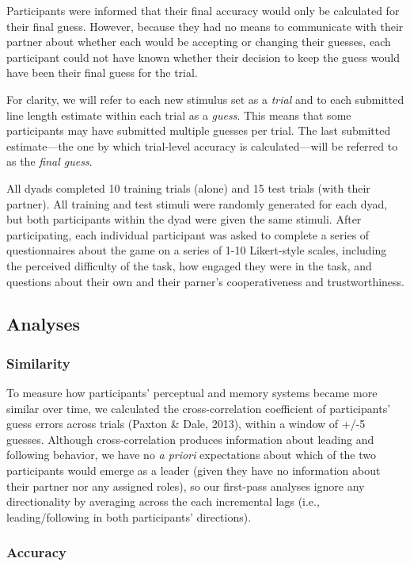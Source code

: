 \documentclass[10pt, letterpaper]{article}
\begin{document}
Participants were informed that their final accuracy would only be
calculated for their final guess. However, because they had no means to
communicate with their partner about whether each would be accepting or
changing their guesses, each participant could not have known whether
their decision to keep the guess would have been their final guess for
the trial.

For clarity, we will refer to each new stimulus set as a \emph{trial}
and to each submitted line length estimate within each trial as a
\emph{guess}. This means that some participants may have submitted
multiple guesses per trial. The last submitted estimate---the one by
which trial-level accuracy is calculated---will be referred to as the
\emph{final guess}.

All dyads completed 10 training trials (alone) and 15 test trials (with
their partner). All training and test stimuli were randomly generated
for each dyad, but both participants within the dyad were given the same
stimuli. After participating, each individual participant was asked to
complete a series of questionnaires about the game on a series of 1-10
Likert-style scales, including the perceived difficulty of the task, how
engaged they were in the task, and questions about their own and their
parner's cooperativeness and trustworthiness.

\subsection{Analyses}\label{analyses}

\subsubsection{Similarity}\label{similarity}

To measure how participants' perceptual and memory systems became more
similar over time, we calculated the cross-correlation coefficient of
participants' guess errors across trials (Paxton \& Dale, 2013), within
a window of +/-5 guesses. Although cross-correlation produces
information about leading and following behavior, we have no \emph{a
priori} expectations about which of the two participants would emerge as
a leader (given they have no information about their partner nor any
assigned roles), so our first-pass analyses ignore any directionality by
averaging across the each incremental lags (i.e., leading/following in
both participants' directions).

\subsubsection{Accuracy}\label{accuracy}
\end{document}
